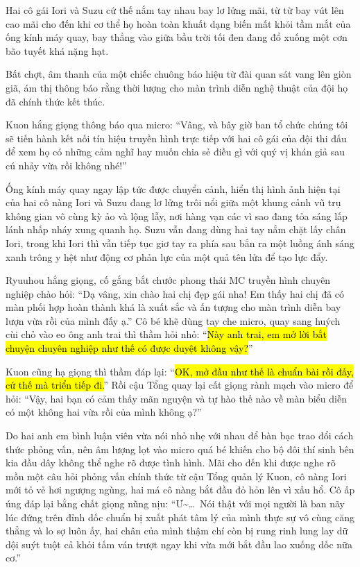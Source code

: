 \documentclass[../main.tex]{subfiles}
\begin{document}
Hai cô gái Iori và Suzu cứ thế nắm tay nhau bay lơ lửng mãi, từ từ bay vút lên cao mãi cho đến khi cơ thể họ hoàn toàn khuất dạng biến mất khỏi tầm mắt của ống kính máy quay, bay thẳng vào giữa bầu trời tối đen đang đổ xuống một cơn bão tuyết khá nặng hạt.

Bất chợt, âm thanh của một chiếc chuông báo hiệu từ đài quan sát vang lên giòn giã, ám thị thông báo rằng thời lượng cho màn trình diễn nghệ thuật của đội họ đã chính thức kết thúc.

Kuon hắng giọng thông báo qua micro: ``Vâng, và bây giờ ban tổ chức chúng tôi sẽ tiến hành kết nối tín hiệu truyền hình trực tiếp với hai cô gái của đội thi đấu để xem họ có những cảm nghĩ hay muốn chia sẻ điều gì với quý vị khán giả sau cú nhảy vừa rồi không nhé!''

Ống kính máy quay ngay lập tức được chuyển cảnh, hiển thị hình ảnh hiện tại của hai cô nàng Iori và Suzu đang lơ lửng trôi nổi giữa một khung cảnh vũ trụ không gian vô cùng kỳ ảo và lộng lẫy, nơi hàng vạn các vì sao đang tỏa sáng lấp lánh nhấp nháy xung quanh họ. Suzu vẫn đang dùng hai tay nắm chặt lấy chân Iori, trong khi Iori thì vẫn tiếp tục giơ tay ra phía sau bắn ra một luồng ánh sáng xanh trông y hệt như động cơ phản lực của một quả tên lửa để tạo lực đẩy.

Ryuuhou hắng giọng, cố gắng bắt chước phong thái MC truyền hình chuyên nghiệp chào hỏi: ``Dạ vâng, xin chào hai chị đẹp gái nha! Em thấy hai chị đã có màn phối hợp hoàn thành khá là xuất sắc và ấn tượng cho màn trình diễn bay lượn vừa rồi của mình đấy ạ.'' Cô bé khẽ dùng tay che micro, quay sang huých cùi chỏ vào eo ông anh trai thì thầm hỏi nhỏ: ``\hl{Này anh trai, em mở lời bắt chuyện chuyên nghiệp như thế có được duyệt không vậy?}''

Kuon cũng hạ giọng thì thầm đáp lại: ``\hl{OK, mở đầu như thế là chuẩn bài rồi đấy, cứ thế mà triển tiếp đi.}'' Rồi cậu Tổng quay lại cất giọng rành mạch vào micro để hỏi: ``Vậy, hai bạn có cảm thấy mãn nguyện và tự hào thế nào về màn biểu diễn có một không hai vừa rồi của mình không ạ?''

Do hai anh em bình luận viên vừa nói nhỏ nhẹ với nhau để bàn bạc trao đổi cách thức phỏng vấn, nên âm lượng lọt vào micro quá bé khiến cho bộ đôi thí sinh bên kia đầu dây không thể nghe rõ được tình hình. Mãi cho đến khi được nghe rõ mồn một câu hỏi phỏng vấn chính thức từ cậu Tổng quản lý Kuon, cô nàng Iori mới tỏ vẻ hơi ngượng ngùng, hai má cô nàng bắt đầu đỏ hỏn lên vì xấu hổ. Cô ấp úng đáp lại bằng chất giọng nũng nịu: ``Ư\~{}\dots\ Nói thật với mọi người là ban nãy lúc đứng trên đỉnh dốc chuẩn bị xuất phát tâm lý của mình thực sự vô cùng căng thẳng và lo sợ luôn ấy, hai chân của mình thậm chí còn bị rung rinh lung lay dữ dội suýt tuột cả khỏi tấm ván trượt ngay khi vừa mới bắt đầu lao xuống dốc nữa cơ.''
\end{document}

